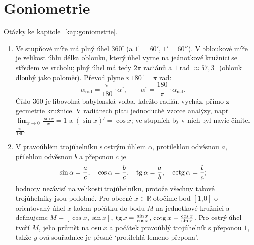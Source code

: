 \section{Goniometrie}

Otázky ke kapitole~\ref{kap:goniometrie}.

\begin{enumerate}[label=\textbf{\arabic*.}, leftmargin=*, itemsep=0.8em]
  \item {}
  Ve stupňové míře má plný úhel $360^\circ$ (a $1^\circ = 60'$, $1' = 60''$). V obloukové míře je velikost úhlu délka oblouku, který úhel vytne na jednotkové kružnici se středem ve vrcholu; plný úhel má tedy $2\pi$ radiánů a $1$ rad $\approx 57{,}3^\circ$ (oblouk dlouhý jako poloměr). Převod plyne z $180^\circ = \pi$ rad:
  \begin{equation*}
    \alpha_{\text{rad}} = \frac{\pi}{180}\cdot\alpha^\circ, \qquad \alpha^\circ = \frac{180}{\pi}\cdot\alpha_{\text{rad}}.
  \end{equation*}
  Číslo $360$ je libovolná babylonská volba, kdežto radián vychází přímo z geometrie kružnice. V radiánech platí jednoduché vzorce analýzy, např. $\lim_{x\to 0}\frac{\sin x}{x} = 1$ a $(\sin x)' = \cos x$; ve stupních by v nich byl navíc činitel $\frac{\pi}{180}$. 

  \item {}
  V pravoúhlém trojúhelníku s ostrým úhlem $\alpha$, protilehlou odvěsnou $a$, přilehlou odvěsnou $b$ a přeponou $c$ je
  \begin{equation*}
    \sin\alpha = \frac{a}{c},\quad \cos\alpha = \frac{b}{c},\quad \operatorname{tg}\alpha = \frac{a}{b},\quad \operatorname{cotg}\alpha = \frac{b}{a};
  \end{equation*}
  hodnoty nezávisí na velikosti trojúhelníku, protože všechny takové trojúhelníky jsou podobné. Pro obecné $x\in\mathbb{R}$ otočíme bod $[1, 0]$ o orientovaný úhel $x$ kolem počátku do bodu $M$ na jednotkové kružnici a definujeme $M = [\cos x, \sin x]$, $\operatorname{tg} x = \frac{\sin x}{\cos x}$, $\operatorname{cotg} x = \frac{\cos x}{\sin x}$. Pro ostrý úhel tvoří $M$, jeho průmět na osu $x$ a počátek pravoúhlý trojúhelník s přeponou $1$, takže $y$-ová souřadnice je přesně `protilehlá lomeno přepona'. 


\end{enumerate}
